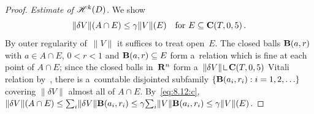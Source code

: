 \begin{proof}
    \emph{Estimate of $\mathscr{H}^{k}(D)$.} We show
    \begin{equation}
        \label{eq:8.12:13}
        \|\delta V\|(A \cap E) \le \gamma \|V\|(E) \quad \text{for $E \subseteq \mathbf{C} ( T, 0, 5 )$}
        \,.
    \end{equation}
    By outer regularity of~$\|V\|$ it suffices to treat open~$E$. The closed balls $\mathbf{B}(a,r)$
    with $a \in A \cap E$, $0 < r < 1$ and $\mathbf{B}(a,r) \subseteq E$ form a~relation which is fine
    at each point of $A \cap E$; since the closed balls in~$\mathbf{R}^{n}$ form a~$\|\delta V\|
    \restrict \cylind{T}{0}{5}$ Vitali relation by~\cite[2.8.9, 2.8.18]{Federer1969}, there is
    a~countable disjointed subfamily $\{ \mathbf{B}(a_i,r_i) : i = 1, 2, \ldots \}$ covering $\|\delta
    V\|$ almost all of $A \cap E$. By~\eqref{eq:8.12:c}, $\|\delta V\|(A \cap E) \le
    {\textstyle\sum_{i}^{}} \|\delta V\| \mathbf{B}(a_i,r_i) \le \gamma {\textstyle\sum_{i}^{}} \|V\| \mathbf{B}(a_i,r_i) \le
    \gamma \|V\|(E)$.


\end{proof}
